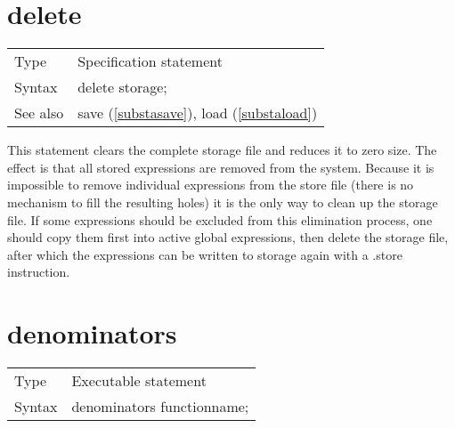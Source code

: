 
\section{delete}
\label{substadelete}

\noindent \begin{tabular}{ll}
Type & Specification statement\\
Syntax & delete storage;
\\ See also & save (\ref{substasave}), load (\ref{substaload})
\end{tabular} \vspace{4mm}

\noindent This statement clears the complete 
storage file and 
reduces it to zero size. The effect is that all stored expressions are 
removed from the system. Because it is impossible to remove individual 
expressions from the store file (there is no mechanism to fill the 
resulting holes) it is the only way to clean up the storage file. If some 
expressions should be excluded from this elimination process, one should 
copy them first into active global expressions, then delete the storage 
file, after which the expressions can be written to storage again with a 
.store instruction. \vspace{10mm}


\section{denominators}
\label{substadenominators}

\noindent \begin{tabular}{ll}
Type & Executable statement\\
Syntax & denominators functionname;
\end{tabular} \vspace{4mm}

